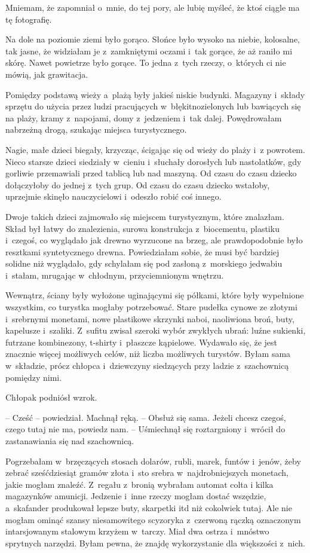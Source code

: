 \documentclass[oneside,polish,11pt,sfheadings]{mwbk}
\begin{document}
Mniemam, że zapomniał o~mnie, do tej pory, ale lubię myśleć, że ktoś
ciągle ma tę fotografię.

Na dole na poziomie ziemi było gorąco. Słońce było wysoko na niebie,
kolosalne, tak jasne, że widziałam je z~zamkniętymi oczami i~tak gorące,
że aż raniło mi skórę. Nawet powietrze było gorące. To jedna z~tych
rzeczy, o~których ci nie mówią, jak grawitacja.

Pomiędzy podstawą wieży a~plażą były jakieś niskie budynki. Magazyny i~składy sprzętu do użycia przez ludzi pracujących w~błękitno\dywiz zielonych
lub bawiących się na plaży, kramy z~napojami, domy z~jedzeniem i~tak
dalej. Powędrowałam nabrzeżną drogą, szukając miejsca turystycznego.

Nagie, małe dzieci biegały, krzycząc, ścigając się od wieży do plaży i~z powrotem. Nieco starsze dzieci siedziały w~cieniu i~słuchały dorosłych
lub nastolatków, gdy gorliwie przemawiali przed tablicą lub nad maszyną.
Od czasu do czasu dziecko dołączyłoby do jednej z~tych grup. Od czasu do
czasu dziecko wstałoby, uprzejmie skinęło nauczycielowi i~odeszło robić
coś innego.

Dwoje takich dzieci zajmowało się miejscem turystycznym, które
znalazłam. Skład był łatwy do znalezienia, surowa konstrukcja z~biocementu, plastiku i~czegoś, co wyglądało jak drewno wyrzucone na
brzeg, ale prawdopodobnie było resztkami syntetycznego drewna.
Powiedziałam sobie, że musi być bardziej solidne niż wyglądało, gdy
schylałam się pod zasłoną z~morskiego jedwabiu i~stałam, mrugając w~chłodnym, przyciemnionym wnętrzu.

Wewnątrz, ściany były wyłożone uginającymi się półkami, które były
wypełnione wszystkim, co turystka mogłaby potrzebować. Stare pudełka
cynowe ze złotymi i~srebrnymi monetami, nowe plastikowe skrzynki naboi,
naoliwiona broń, buty, kapelusze i~szaliki. Z~sufitu zwisał szeroki
wybór zwykłych ubrań: luźne sukienki, futrzane kombinezony, t-shirty i~płaszcze kąpielowe. Wydawało się, że jest znacznie więcej możliwych
celów, niż liczba możliwych turystów. Byłam sama w~składzie, prócz
chłopca i~dziewczyny siedzących przy ladzie z~szachownicą pomiędzy nimi.

Chłopak podniósł wzrok. 

-- Cześć -- powiedział. Machnął ręką. -- Obsłuż się
sama. Jeżeli chcesz czegoś, czego tutaj nie ma, powiedz nam. -- Uśmiechnął się roztargniony i~wrócił do zastanawiania się nad
szachownicą.

Pogrzebałam w~brzęczących stosach dolarów, rubli, marek, funtów i~jenów,
żeby zebrać sześćdziesiąt gramów złota i~sto srebra w~najdrobniejszych
monetach, jakie mogłam znaleźć. Z~regału z~bronią wybrałam automat colta
i kilka magazynków amunicji. Jedzenie i~inne rzeczy mogłam dostać
wszędzie, a~skafander produkował lepsze buty, skarpetki itd niż
cokolwiek tutaj. Ale nie mogłam ominąć szansy niesamowitego scyzoryka z~czerwoną rączką oznaczonym intarsjowanym stalowym krzyżem w~tarczy. Miał
dwa ostrza i~mnóstwo sprytnych narzędzi. Byłam pewna, że znajdę
wykorzystanie dla większości z~nich.
\end{document}
